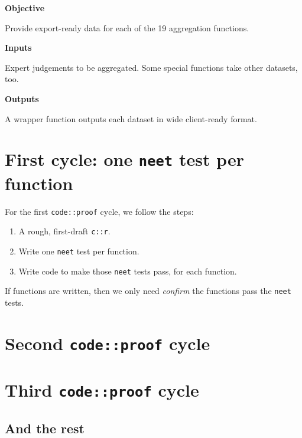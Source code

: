 \documentclass[
]{article}
\providecommand{\tightlist}{%
  \setlength{\itemsep}{0pt}\setlength{\parskip}{0pt}}
\begin{document}
\textbf{Objective}

Provide export-ready data for each of the 19 aggregation functions.

\textbf{Inputs}

Expert judgements to be aggregated. Some special functions take other
datasets, too.

\textbf{Outputs}

A wrapper function outputs each dataset in wide client-ready format.

\hypertarget{first-cycle-one-neet-test-per-function}{%
\section{\texorpdfstring{First cycle: one \texttt{neet} test per
function}{First cycle: one neet test per function}}\label{first-cycle-one-neet-test-per-function}}

For the first \texttt{code::proof} cycle, we follow the steps:

\begin{enumerate}
\def\labelenumi{\arabic{enumi}.}
\tightlist
\item
  A rough, first-draft \texttt{c::r}.
\item
  Write one \texttt{neet} test per function.
\item
  Write code to make those \texttt{neet} tests pass, for each function.
\end{enumerate}

If functions are written, then we only need \emph{confirm} the functions
pass the \texttt{neet} tests.

\hypertarget{second-codeproof-cycle}{%
\section{\texorpdfstring{Second \texttt{code::proof}
cycle}{Second code::proof cycle}}\label{second-codeproof-cycle}}

\hypertarget{third-codeproof-cycle}{%
\section{\texorpdfstring{Third \texttt{code::proof}
cycle}{Third code::proof cycle}}\label{third-codeproof-cycle}}

\hypertarget{and-the-rest}{%
\subsection{And the rest}\label{and-the-rest}}
\end{document}
